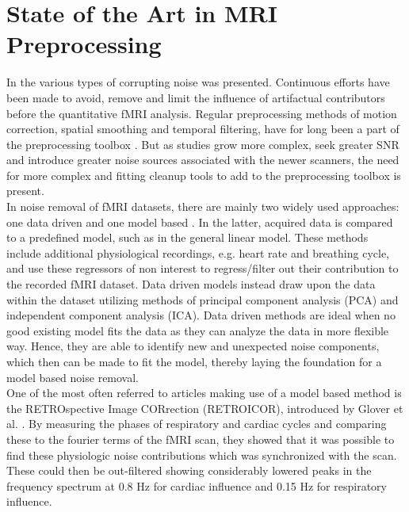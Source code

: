 \section{State of the Art in MRI Preprocessing}

In  the various types of corrupting noise was presented. Continuous efforts have been made to avoid, remove and limit the influence of artifactual contributors before the quantitative fMRI analysis. Regular preprocessing methods of motion correction, spatial smoothing and temporal filtering, have for long been a part of the preprocessing toolbox \cite{Poldrack2011}. But as studies grow more complex, seek greater SNR and introduce greater noise sources associated with the newer scanners, the need for more complex and fitting cleanup tools to add to the preprocessing toolbox is present. \cite{Wood2012,Liu2006} \\
In noise removal of fMRI datasets, there are mainly two widely used approaches: one data driven and one model based \cite{Salimi-Khorshidi2014,Iraji2016}.  In the latter, acquired data is compared to a predefined model, such as in the general linear model. These methods include additional physiological recordings, e.g. heart rate and breathing cycle, and use these regressors of non interest to regress/filter out their contribution to the recorded fMRI dataset. \cite{Salimi-Khorshidi2014,Iraji2016,Monti2011} Data driven models instead draw upon the data within the dataset utilizing methods of principal component analysis (PCA) and independent component analysis (ICA). Data driven methods are ideal when no good existing model fits the data as they can analyze the data in more flexible way. Hence, they are able to identify new and unexpected noise components, which then can be made to fit the model, thereby laying the foundation for a model based noise removal. \cite{Iraji2016} \\
One of the most often referred to articles making use of a model based method is the RETROspective Image CORrection (RETROICOR), introduced by Glover et al. \cite{Glover2000}. By measuring the phases of respiratory and cardiac cycles and comparing these to the fourier terms of the fMRI scan, they showed that it was possible to find these physiologic noise contributions which was synchronized with the scan. These could then be out-filtered showing considerably lowered peaks in the frequency spectrum at 0.8 Hz for cardiac influence and 0.15 Hz for respiratory influence. \cite{Glover2000} \\
